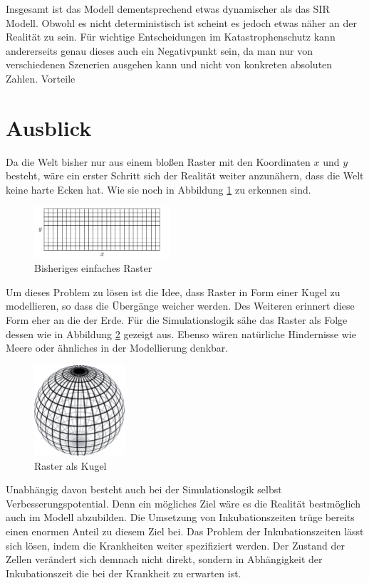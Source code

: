 \documentclass[10pt,twocolumn]{scrartcl}
\begin{document}
Insgesamt ist das Modell dementsprechend etwas dynamischer als das SIR Modell. Obwohl es nicht deterministisch ist scheint es jedoch etwas näher an der Realität zu sein. Für wichtige Entscheidungen im Katastrophenschutz kann andererseits genau dieses auch ein Negativpunkt sein, da man nur von verschiedenen Szenerien ausgehen kann und nicht von konkreten absoluten Zahlen.
Vorteile

\section*{Ausblick}
Da die Welt bisher nur aus einem bloßen Raster mit den Koordinaten $x$ und $y$ besteht, wäre ein erster Schritt sich der Realität weiter anzunähern, dass die Welt keine harte Ecken hat. Wie sie noch in Abbildung \ref{fig:welt} zu erkennen sind.
\begin{figure}[H]
	\centering
	\includegraphics[width= 0.45\textwidth]{./images/map.png}
	\caption{Bisheriges einfaches Raster}
	\label{fig:welt}
\end{figure}
Um dieses Problem zu lösen ist die Idee, dass Raster in Form einer Kugel zu modellieren, so dass die Übergänge weicher werden. Des Weiteren erinnert diese Form eher an die der Erde. Für die Simulationslogik sähe das Raster als Folge dessen wie in Abbildung \ref{fig:kugel} gezeigt aus. Ebenso wären natürliche Hindernisse wie Meere oder ähnliches in der Modellierung denkbar.
\begin{figure}[H]
	\centering
	\includegraphics[width= 0.3\textwidth]{./images/kugel.pdf}
	\caption{Raster als Kugel\cite{WikiKugel:2014}}
	\label{fig:kugel}
\end{figure}


Unabhängig davon besteht auch bei der Simulationslogik selbst Verbesserungspotential. Denn ein mögliches Ziel wäre es die Realität bestmöglich auch im Modell abzubilden.
Die Umsetzung von Inkubationszeiten trüge bereits einen enormen Anteil zu diesem Ziel bei. 
Das Problem der Inkubationszeiten lässt sich lösen, indem die Krankheiten weiter spezifiziert werden. Der Zustand der Zellen verändert sich demnach nicht direkt, sondern in Abhängigkeit der Inkubationszeit die bei der Krankheit zu erwarten ist.
\end{document}
